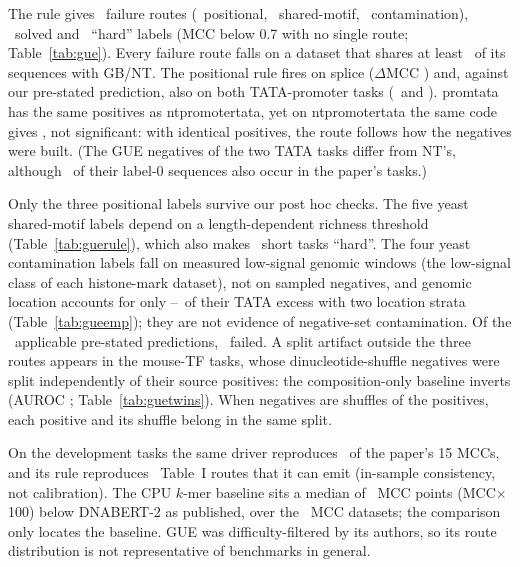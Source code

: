 \documentclass[journal,onecolumn,10pt,letterpaper]{IEEEtran}
\newcommand{\tasku}{\textunderscore\allowbreak}
\DeclareRobustCommand{\task}[1]{{\normalfont\ttfamily\upshape\let\_\tasku #1}}
\begin{document}
The rule gives \smGueFail\ failure routes (\smGuePos\ positional, \smGueShared\ shared-motif,
\smGueContam\ contamination), \smGueSolved\ solved and \smGueHard\ ``hard'' labels (MCC below 0.7 with no
single route; Table~\ref{tab:gue}).
Every failure route falls on a dataset that shares at least \smGueMinShared\ of its sequences with
GB/NT. The positional rule fires on splice ($\Delta$MCC \smGueDeltaSplice) and, against our pre-stated
prediction, also on both TATA-promoter tasks (\smGueDeltaCore\ and \smGueDeltaThreeHundred).
\task{prom\_300\_tata} has the same positives as \task{nt\_promoter\_tata}, yet on \task{nt\_promoter\_tata}
the same code gives \smNtPromTataDelta, not significant: with identical positives, the route follows how
the negatives were built. (The GUE negatives of the two TATA tasks differ from NT's, although
\smPromLabelZero\ of their label-0 sequences also occur in the paper's tasks.)

Only the three positional labels survive our post hoc checks. The five yeast shared-motif labels depend
on a length-dependent richness threshold (Table~\ref{tab:guerule}), which also makes \smGueHardRich\ short tasks
``hard''. The four yeast contamination labels fall on measured low-signal genomic windows (the
low-signal class of each histone-mark dataset), not on sampled negatives, and genomic location accounts
for only \smEmpShareLo--\smEmpShareHi\ of their TATA excess with two location strata
(Table~\ref{tab:gueemp}); they are not evidence of negative-set contamination. Of the
\smGuePredApplicable\ applicable pre-stated predictions, \smGuePredFail\ failed. A split artifact outside
the three routes appears in the mouse-TF tasks, whose dinucleotide-shuffle negatives were split
independently of their source positives: the composition-only baseline inverts (AUROC \smTwinAuc;
Table~\ref{tab:guetwins}). When negatives are shuffles of the positives, each positive and its shuffle
belong in the same split.

On the development tasks the same driver reproduces \smPaperMCCRepro\ of the paper's 15 MCCs, and its rule reproduces
\smCliAgree\ Table~I routes that it can emit (in-sample consistency, not calibration). The CPU $k$-mer
baseline sits a median of \smGueGapMedian\ MCC points (MCC$\times$100) below DNABERT-2 as published, over
the \smGueGapN\ MCC datasets; the comparison only locates the baseline. GUE was difficulty-filtered by its authors, so its
route distribution is not representative of benchmarks in general.







\end{document}
